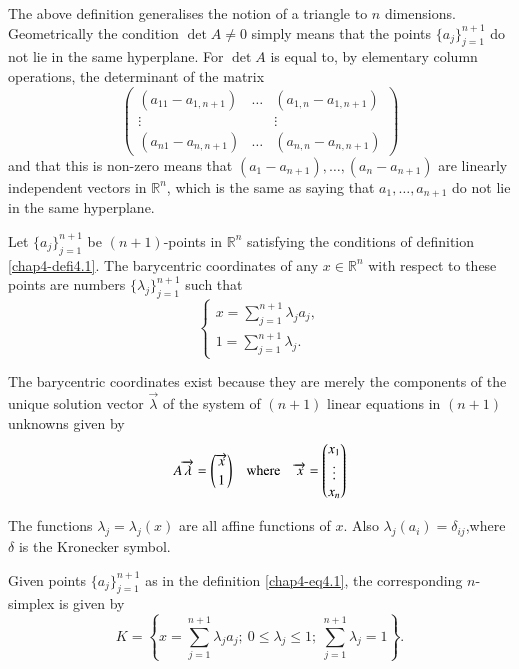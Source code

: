 The above definition generalises the notion of a triangle to $n$
dimensions. Geometrically the condition $\det A\neq 0$ simply means
that the points $\{a_{j}\}^{n+1}_{j=1}$ do not lie in the same
hyperplane. For $\det A$ is equal to, by elementary column operations,
the determinant of the matrix
$$
\begin{pmatrix}
(a_{11}-a_{1,n+1}) & \ldots & (a_{1,n}-a_{1,n+1})\\
\vdots & & \vdots\\
(a_{n1}-a_{n,n+1}) & \ldots & (a_{n,n}-a_{n,n+1})
\end{pmatrix}
$$
and that this is non-zero means that
$(a_{1}-a_{n+1}),\ldots,(a_{n}-a_{n+1})$ are linearly independent
vectors in $\mathbb{R}^{n}$, which is the same as saying that
$a_{1},\ldots,a_{n+1}$ do not lie in the same hyperplane.

\begin{definition}\label{chap4-defi4.2}
Let $\{a_{j}\}^{n+1}_{j=1}$ be $(n+1)$-points in $\mathbb{R}^{n}$
satisfying the conditions of definition \ref{chap4-defi4.1}. The
barycentric coordinates of any $x\in \mathbb{R}^{n}$ with respect to
these points are numbers $\{\lambda_{j}\}^{n+1}_{j=1}$ such that
\begin{equation*}
\begin{cases}
x=\sum\limits^{n+1}_{j=1}\lambda_{j}a_{j},\\
1=\sum\limits^{n+1}_{j=1}\lambda_{j}.
\end{cases}\tag{4.2}\label{chap4-eq4.2}
\end{equation*}
\end{definition}

The barycentric coordinates exist because they are merely the
components of the unique solution vector $\overrightarrow{\lambda}$ of
the system of $(n+1)$ linear equations in $(n+1)$ unknowns given by
\begin{equation*}
A\overrightarrow{\lambda}=\binom{\overrightarrow{x}}{1}\quad\text{where}\quad
\overrightarrow{x}=
\begin{pmatrix}
x_{1}\\
\vdots\\
x_{n}
\end{pmatrix}
\end{equation*}

The functions $\lambda_{j}=\lambda_{j}(x)$ are all affine functions of
$x$. Also $\lambda_{j}(a_{i})=\delta_{ij}$,\pageoriginale where
$\delta$ is the Kronecker symbol.

\begin{remark}\label{chap4-rem4.1}
Given points $\{a_{j}\}^{n+1}_{j=1}$ as in the definition
\eqref{chap4-eq4.1}, the corresponding $n$-simplex is given by
$$ 
K=\left\{x=\sum\limits^{n+1}_{j=1}\lambda_{j}a_{j};\ 0\leq
\lambda_{j}\leq 1;\ \sum\limits^{n+1}_{j=1}\lambda_{j}=1\right\}. 
$$
\end{remark}

